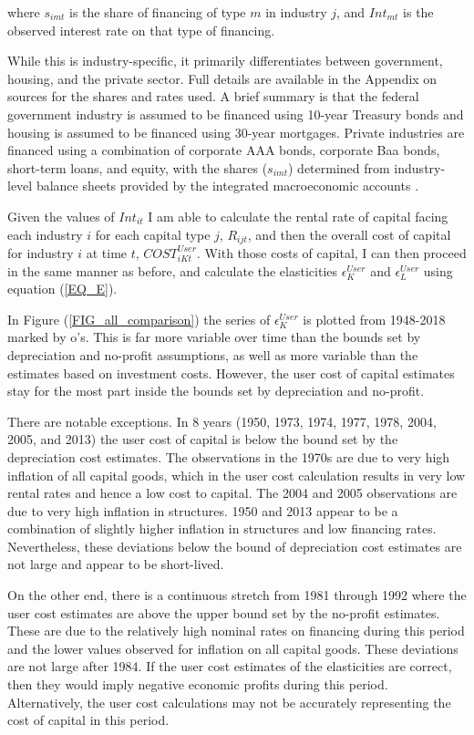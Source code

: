 \documentclass[11pt]{article}
\begin{document}
where $s_{imt}$ is the share of financing of type $m$ in industry $j$, and $Int_{mt}$ is the observed interest rate on that type of financing. 

While this is industry-specific, it primarily differentiates between government, housing, and the private sector. Full details are available in the Appendix on sources for the shares and rates used. A brief summary is that the federal government industry is assumed to be financed using 10-year Treasury bonds and housing is assumed to be financed using 30-year mortgages. Private industries are financed using a combination of corporate AAA bonds, corporate Baa bonds, short-term loans, and equity, with the shares ($s_{imt}$) determined from industry-level balance sheets provided by the integrated macroeconomic accounts \citep{beaimap}.

Given the values of $Int_{it}$ I am able to calculate the rental rate of capital facing each industry $i$ for each capital type $j$, $R_{ijt}$, and then the overall cost of capital for industry $i$ at time $t$, $COST^{User}_{iKt}$. With those costs of capital, I can then proceed in the same manner as before, and calculate the elasticities $\epsilon_K^{User}$ and $\epsilon_L^{User}$ using equation (\ref{EQ_E}).

In Figure (\ref{FIG_all_comparison}) the series of $\epsilon_K^{User}$ is plotted from 1948-2018 marked by o's. This is far more variable over time than the bounds set by depreciation and no-profit assumptions, as well as more variable than the estimates based on investment costs. However, the user cost of capital estimates stay for the most part inside the bounds set by depreciation and no-profit.

There are notable exceptions. In 8 years (1950, 1973, 1974, 1977, 1978, 2004, 2005, and 2013) the user cost of capital is below the bound set by the depreciation cost estimates. The observations in the 1970s are due to very high inflation of all capital goods, which in the user cost calculation results in very low rental rates and hence a low cost to capital. The 2004 and 2005 observations are due to very high inflation in structures. 1950 and 2013 appear to be a combination of slightly higher inflation in structures and low financing rates. Nevertheless, these deviations below the bound of depreciation cost estimates are not large and appear to be short-lived. 

On the other end, there is a continuous stretch from 1981 through 1992 where the user cost estimates are above the upper bound set by the no-profit estimates. These are due to the relatively high nominal rates on financing during this period and the lower values observed for inflation on all capital goods. These deviations are not large after 1984. If the user cost estimates of the elasticities are correct, then they would imply negative economic profits during this period. Alternatively, the user cost calculations may not be accurately representing the cost of capital in this period.
\end{document}
